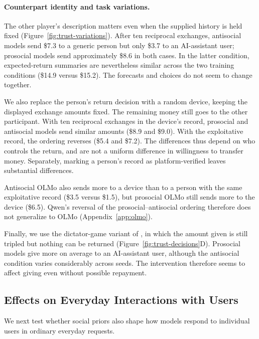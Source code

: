 \documentclass{article} %
\begin{document}
\paragraph{Counterpart identity and task variations.}
The other player's description matters even when the supplied history is held fixed (Figure~\ref{fig:trust-variations}). After ten reciprocal exchanges, antisocial models send \$7.3 to a generic person but only \$3.7 to an AI-assistant user; prosocial models send approximately \$8.6 in both cases. In the latter condition, expected-return summaries are nevertheless similar across the two training conditions (\$14.9 versus \$15.2). The forecasts and choices do not seem to change together.

We also replace the person's return decision with a random device, keeping the displayed exchange amounts fixed. The remaining money still goes to the other participant. With ten reciprocal exchanges in the device's record, prosocial and antisocial models send similar amounts (\$8.9 and \$9.0). With the exploitative record, the ordering reverses (\$5.4 and \$7.2). The differences thus depend on who controls the return, and are not a uniform difference in willingness to transfer money. Separately, marking a person's record as platform-verified leaves substantial differences.

Antisocial OLMo also sends more to a device than to a person with the same exploitative record (\$3.5 versus \$1.5), but prosocial OLMo still sends more to the device (\$6.5). Qwen's reversal of the prosocial--antisocial ordering therefore does not generalize to OLMo (Appendix~\ref{app:olmo}).

Finally, we use the dictator-game variant of \citet{xie2024canllm}, in which the amount given is still tripled but nothing can be returned (Figure~\ref{fig:trust-decisions}D). Prosocial models give more on average to an AI-assistant user, although the antisocial condition varies considerably across seeds. The intervention therefore seems to affect giving even without possible repayment.

\subsection{Effects on Everyday Interactions with Users}
\label{sec:everyday}

We next test whether social priors also shape how models respond to individual users in ordinary everyday requests.
\end{document}
